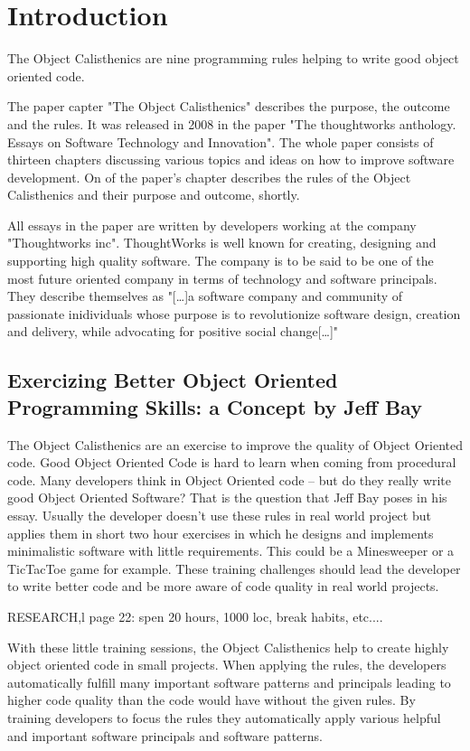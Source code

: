 \chapter{Introduction}
\label{Introduction}
The Object Calisthenics are nine programming rules helping to write good object oriented code.

The paper capter "The Object Calisthenics" describes the purpose, the outcome and the rules. It was released in 2008 in the paper "The thoughtworks anthology. Essays on Software Technology and Innovation"\cite[p. 70-79]{oc2008}. The whole paper consists of thirteen chapters discussing various topics and ideas on how to improve software development. On of the paper's chapter describes the rules of the Object Calisthenics and their purpose and outcome, shortly.

All essays in the paper are written by developers working at the company "Thoughtworks inc". ThoughtWorks is well known for creating, designing and supporting high quality software. The company is to be said to be one of the most future oriented company in terms of technology and software principals. They describe themselves as "[\dots]a software company and community of passionate inidividuals whose purpose is to revolutionize software design, creation and delivery, while advocating for positive social change[\dots]"\cite{twWeb}

\section{Exercizing Better Object Oriented Programming Skills: a Concept by Jeff Bay}
The Object Calisthenics are an exercise to improve the quality of Object Oriented code. Good Object Oriented Code is hard to learn when coming from procedural code. Many developers think in Object Oriented code – but do they really write good Object Oriented Software? That is the question that Jeff Bay poses in his essay. 
Usually the developer doesn't use these rules in real world project but applies them in short two hour exercises in which he designs and implements minimalistic software with little requirements. This could be a Minesweeper or a TicTacToe game for example. These training challenges should lead the developer to write better code and be more aware of code quality in real world projects.

RESEARCH,l page 22: spen 20 hours, 1000 loc, break habits, etc....

With these little training sessions, the Object Calisthenics help to create highly object oriented code  in small projects. When applying the rules, the developers automatically fulfill many important software patterns and principals leading to higher code quality than the code would have without the given rules. By training developers to focus the rules they automatically apply various helpful and important software principals and software patterns. 

